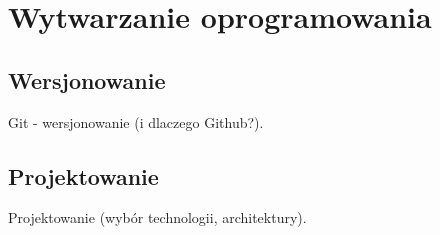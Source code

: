 \chapter{Wytwarzanie oprogramowania}

\section{Wersjonowanie}
Git - wersjonowanie (i dlaczego Github?).

\section{Projektowanie}
Projektowanie (wybór technologii, architektury).


